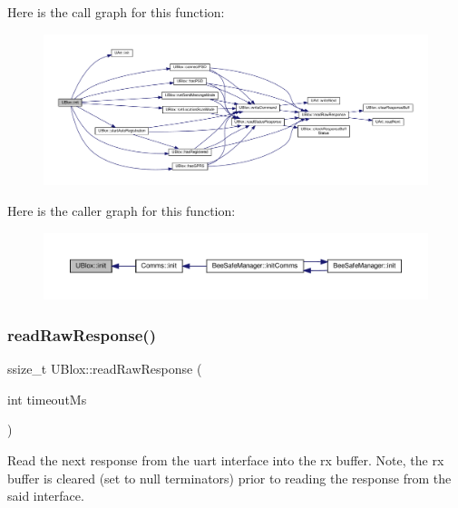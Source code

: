 Here is the call graph for this function\+:\nopagebreak
\begin{figure}[H]
\begin{center}
\leavevmode
\includegraphics[width=350pt]{da/df6/class_u_blox_a34c2f507ff3bbd21b9aea788a015527a_cgraph}
\end{center}
\end{figure}
Here is the caller graph for this function\+:\nopagebreak
\begin{figure}[H]
\begin{center}
\leavevmode
\includegraphics[width=350pt]{da/df6/class_u_blox_a34c2f507ff3bbd21b9aea788a015527a_icgraph}
\end{center}
\end{figure}
\mbox{\label{class_u_blox_ab4a7ab4b8922d91e23f273ae160c1bed}} 
\subsubsection{\texorpdfstring{read\+Raw\+Response()}{readRawResponse()}}
{\footnotesize\ttfamily ssize\+\_\+t U\+Blox\+::read\+Raw\+Response (\begin{DoxyParamCaption}\item[{int}]{timeout\+Ms }\end{DoxyParamCaption})\hspace{0.3cm}{\ttfamily [private]}}

Read the next response from the uart interface into the rx buffer. Note, the rx buffer is cleared (set to null terminators) prior to reading the response from the said interface.



